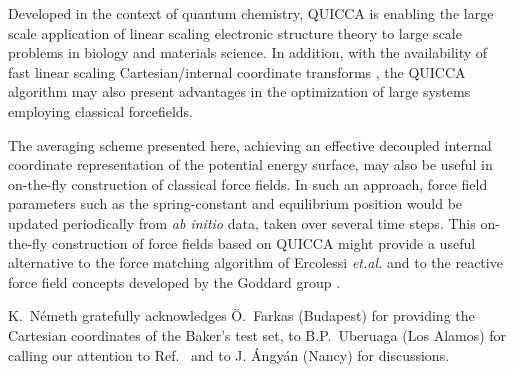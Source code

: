 \documentclass[prl,twocolumn,showpacs,twocolumngrid,superbib]{revtex4}
\begin{document}
Developed in the context of quantum chemistry, QUICCA is enabling the large scale application of  
linear scaling electronic structure theory to large scale problems in biology and materials science. 
In addition, with the availability of fast linear scaling Cartesian/internal coordinate transforms 
\cite{nemeth_coordtrf1}, the QUICCA algorithm may also present advantages in the optimization of 
large systems employing classical forcefields.

The averaging scheme presented here, achieving an effective decoupled internal coordinate representation
of the potential energy surface, may also be useful in on-the-fly construction of classical force fields.
In such an approach, force field parameters such as the spring-constant and equilibrium position 
would be updated periodically from {\em ab initio} data, taken over several time steps. 
This on-the-fly construction of force fields based on QUICCA might provide a useful  alternative to 
the force matching algorithm of Ercolessi {\it et.al.} \cite{force-matching} and to the reactive 
force field concepts developed by the Goddard group \cite{reaxff1,reaxff2}.

\begin{acknowledgments}
K.~N{\'e}meth gratefully acknowledges {\"{O}}.~Farkas (Budapest) for providing the 
Cartesian coordinates of the Baker's test set, to B.P.~Uberuaga (Los Alamos) for 
calling our attention to Ref.~\cite{force-matching} and to J. {\'A}ngy{\'a}n
(Nancy) for discussions.
\end{acknowledgments}


\end{document}
